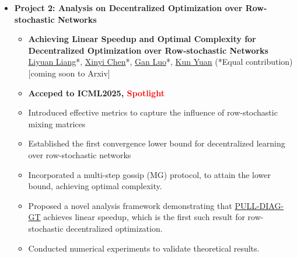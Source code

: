 \begin{itemize}
\begin{itemize}
              \item \textbf{Project 2: Analysis on Decentralized
Optimization over Row-stochastic Networks}
              \begin{itemize}
              \item \textbf{Achieving Linear Speedup and Optimal Complexity for Decentralized Optimization over Row-stochastic Networks}\\
              \href{https://lavaei.ieor.berkeley.edu/Group.html}{Liyuan Liang}*, \href{https://openreview.net/profile?id=~Xinyi_Chen9}{Xinyi Chen}*, \underline{Gan Luo}*, \href{https://kunyuan827.github.io}{Kun Yuan} (*Equal contribution) [coming soon to Arxiv]
                  \item {\textbf{Acceped to ICML2025, \textcolor{red}{Spotlight}}}
                  \item {Introduced effective metrics to capture the influence of row-stochastic mixing matrices}
                  \item {Established the first convergence lower bound for decentralized learning over row-stochastic networks}
                  \item {Incorporated a multi-step gossip (MG) protocol, to attain the lower bound, achieving optimal complexity.}
                  \item {Proposed a novel analysis framework demonstrating that \href{https://arxiv.org/pdf/1803.09169}{PULL-DIAG-GT} achieves linear speedup, which is the first such result for row-stochastic decentralized optimization.}
                  \item{Conducted numerical experiments to validate theoretical results.}
              \end{itemize}
          \end{itemize}


\end{itemize}
